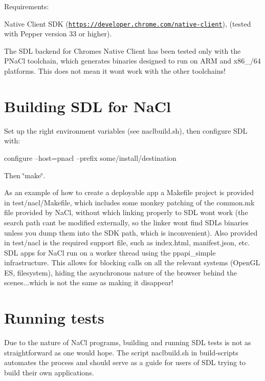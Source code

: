 Requirements\+:


\begin{DoxyItemize}
\item Native Client S\+DK (\href{https://developer.chrome.com/native-client}{\tt https\+://developer.\+chrome.\+com/native-\/client}), (tested with Pepper version 33 or higher).
\end{DoxyItemize}

The S\+DL backend for Chrome\textquotesingle{}s Native Client has been tested only with the P\+Na\+Cl toolchain, which generates binaries designed to run on A\+RM and x86\+\_/64 platforms. This does not mean it won\textquotesingle{}t work with the other toolchains! 

 \section*{Building S\+DL for Na\+Cl }

Set up the right environment variables (see naclbuild.\+sh), then configure S\+DL with\+: \begin{DoxyVerb}configure --host=pnacl --prefix some/install/destination
\end{DoxyVerb}


Then \char`\"{}make\char`\"{}.

As an example of how to create a deployable app a Makefile project is provided in test/nacl/\+Makefile, which includes some monkey patching of the common.\+mk file provided by Na\+Cl, without which linking properly to S\+DL won\textquotesingle{}t work (the search path can\textquotesingle{}t be modified externally, so the linker won\textquotesingle{}t find S\+DL\textquotesingle{}s binaries unless you dump them into the S\+DK path, which is inconvenient). Also provided in test/nacl is the required support file, such as index.\+html, manifest.\+json, etc. S\+DL apps for Na\+Cl run on a worker thread using the ppapi\+\_\+simple infrastructure. This allows for blocking calls on all the relevant systems (Open\+GL ES, filesystem), hiding the asynchronous nature of the browser behind the scenes...which is not the same as making it disappear!



 \section*{Running tests }

Due to the nature of Na\+Cl programs, building and running S\+DL tests is not as straightforward as one would hope. The script naclbuild.\+sh in build-\/scripts automates the process and should serve as a guide for users of S\+DL trying to build their own applications.

